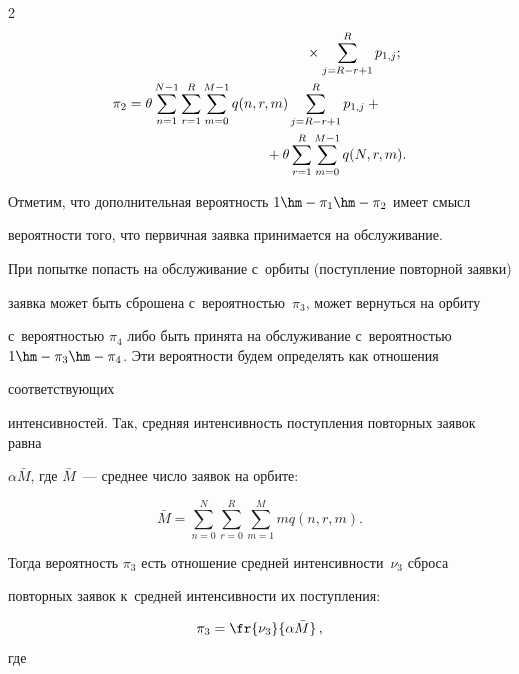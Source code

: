 \begin{multicols}{2}
\begin{align*}
   &\hspace*{45mm}{}\times \sum\limits_{j=R-r+1}^R p_{1,j}; \\

   \pi_2 &= \theta \sum\limits_{n=1}^{N-1}\sum\limits_{r=1}^R  \sum\limits_{m=0}^{M-1} q(n,r,m) 

\sum\limits_{j=R-r+1}^R p_{1,j} +{}\\

&\hspace*{35mm}{}+

   \theta \sum\limits_{r=1}^R \sum\limits_{m=0}^{M-1} q(N,r,m).

\end{align*}

Отметим, что дополнительная ве\-ро\-ят\-ность $1\hm-\pi_ 1\hm-\pi_ 2$ имеет смысл 

ве\-ро\-ят\-ности того, что первичная заявка принимается на об\-слу\-жи\-ва\-ние.



При попытке попасть на обслуживание с~орбиты (по\-ступ\-ле\-ние повторной заявки) 

заявка может быть сброшена с~ве\-ро\-ят\-ностью~$\pi_3$, может вернуться на орбиту 

с~ве\-ро\-ят\-ностью $\pi_4$ либо быть принята на обслуживание с~ве\-ро\-ят\-ностью $1\hm-\pi_3\hm-\pi_4$. Эти вероятности будем определять как отношения 

со\-от\-вет\-ст\-ву\-ющих 

интенсивностей. Так, сред\-няя ин\-тен\-сив\-ность по\-ступ\-ле\-ния по\-втор\-ных заявок равна 

$\alpha \bar{M}$, где $\bar{M}$~--- сред\-нее чис\-ло заявок на орбите:

$$ 

\bar{M}=\sum\limits_{n=0}^N \sum\limits_{r=0}^R \sum\limits_{m=1}^M m q(n,r,m).

$$





Тогда вероятность $\pi_3$ есть отношение сред\-ней ин\-тен\-сив\-ности~$\nu_3$ сброса 

повторных заявок к~сред\-ней ин\-тен\-сив\-ности их по\-ступ\-ле\-ния: 

$$

\pi_3=\fr{{\nu_3}}{\alpha \bar{M}}\,,

$$ где

\begin{multline*} 



\end{multline*}
\end{multicols}
